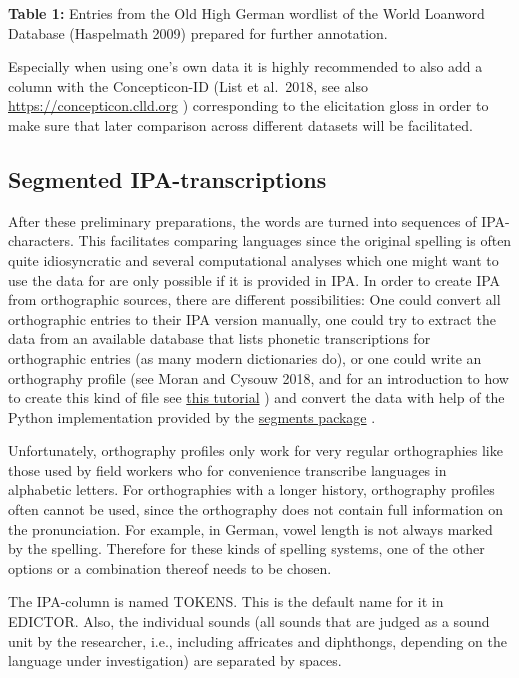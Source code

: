 \documentclass[
  english,
  a4paper,
  oneside,tablecaptionabove
]{scrbook}
\begin{document}
\textbf{Table 1:} Entries from the Old High German wordlist of the World
Loanword Database (Haspelmath 2009) prepared for further annotation.

Especially when using one's own data it is highly recommended to also
add a column with the Concepticon-ID (List et al.~2018, see also
\url{https://concepticon.clld.org} ) corresponding to the elicitation
gloss in order to make sure that later comparison across different
datasets will be facilitated.

\hypertarget{segmented-ipa-transcriptions}{%
\subsection{Segmented
IPA-transcriptions}\label{segmented-ipa-transcriptions}}

After these preliminary preparations, the words are turned into
sequences of IPA-characters. This facilitates comparing languages since
the original spelling is often quite idiosyncratic and several
computational analyses which one might want to use the data for are only
possible if it is provided in IPA. In order to create IPA from
orthographic sources, there are different possibilities: One could
convert all orthographic entries to their IPA version manually, one
could try to extract the data from an available database that lists
phonetic transcriptions for orthographic entries (as many modern
dictionaries do), or one could write an orthography profile (see Moran
and Cysouw 2018, and for an introduction to how to create this kind of
file see
\href{http://htmlpreview.github.io/?https://raw.githubusercontent.com/digling/calc-seminar/master/handouts/Session_6.html}{this
tutorial} ) and convert the data with help of the Python implementation
provided by the \href{https://github.com/cldf/segments}{segments
package} .

Unfortunately, orthography profiles only work for very regular
orthographies like those used by field workers who for convenience
transcribe languages in alphabetic letters. For orthographies with a
longer history, orthography profiles often cannot be used, since the
orthography does not contain full information on the pronunciation. For
example, in German, vowel length is not always marked by the spelling.
Therefore for these kinds of spelling systems, one of the other options
or a combination thereof needs to be chosen.

The IPA-column is named TOKENS. This is the default name for it in
EDICTOR. Also, the individual sounds (all sounds that are judged as a
sound unit by the researcher, i.e., including affricates and diphthongs,
depending on the language under investigation) are separated by spaces.
\end{document}
